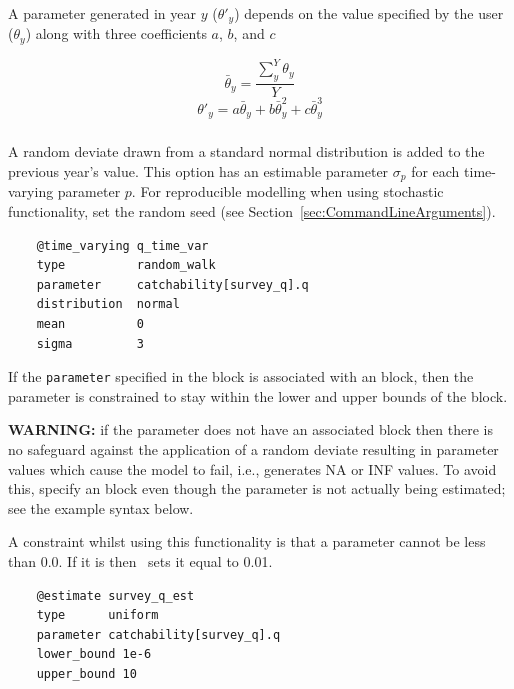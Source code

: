 A parameter generated in year $y$ ($\theta'_y$) depends on the value specified by the user ($\theta_y$) along with three coefficients $a$, $b$, and $c$

\begin{equation}
	\bar{\theta}_y = \frac{\sum_{y}^Y\theta_y}{Y}
\end{equation}
\begin{equation}
	\theta'_y = a \bar{\theta}_y + b\bar{\theta}_y^{2} + c\bar{\theta}_y^{3}
\end{equation}

\subsubsection[Random walk]{}\label{sec:TimeVarying-RandomWalk}

A random deviate drawn from a standard normal distribution is added to the previous year's value. This option has an estimable parameter $\sigma_p$ for each time-varying parameter $p$. For reproducible modelling when using stochastic functionality, set the random seed (see Section~\ref{sec:CommandLineArguments}).

{\small{\begin{verbatim}
	@time_varying q_time_var
	type          random_walk
	parameter     catchability[survey_q].q
	distribution  normal
	mean          0
	sigma         3
\end{verbatim}}}

If the \texttt{parameter} specified in the  block is associated with an  block, then the parameter is constrained to stay within the lower and upper bounds of the  block.

\textbf{WARNING:} if the parameter does not have an associated  block then there is no safeguard against the application of a random deviate resulting in parameter values which cause the model to fail, i.e., generates NA or INF values. To avoid this, specify an  block even though the parameter is not actually being estimated; see the example syntax below.

A constraint whilst using this functionality is that a parameter cannot be less than 0.0. If it is then \CNAME\ sets it equal to 0.01.

{\small{\begin{verbatim}
	@estimate survey_q_est
	type      uniform
	parameter catchability[survey_q].q
	lower_bound 1e-6
	upper_bound 10
\end{verbatim}}}

